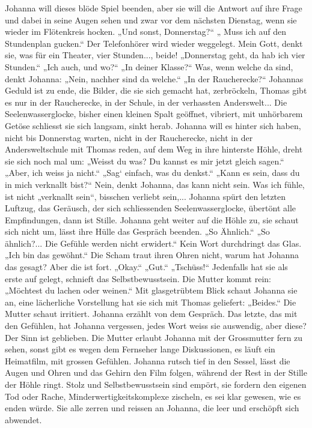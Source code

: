 Johanna will dieses blöde Spiel beenden, aber sie will die Antwort auf ihre Frage und dabei in seine Augen sehen und zwar vor dem nächsten Dienstag, wenn sie wieder im Flötenkreis hocken. „Und sonst, Donnerstag?“ „ Muss ich auf den Stundenplan gucken.“ Der Telefonhörer wird wieder weggelegt. Mein Gott, denkt sie, was für ein Theater, vier Stunden..., beide! „Donnerstag geht, da hab ich vier Stunden.“ „Ich auch, und wo?“ „In deiner Klasse?“ Was, wenn welche da sind, denkt Johanna: „Nein, nachher sind da welche.“ „In der Raucherecke?“ Johannas Geduld ist zu ende, die Bilder, die sie sich gemacht hat, zerbröckeln, Thomas gibt es nur in der Raucherecke, in der Schule, in der verhassten Anderswelt... Die Seelenwasserglocke, bisher einen kleinen Spalt geöffnet, vibriert, mit unhörbarem Getöse schliesst sie sich langsam, sinkt herab. Johanna will es hinter sich haben, nicht bis Donnerstag warten, nicht in der Raucherecke, nicht in der Andersweltschule mit Thomas reden, auf dem Weg in ihre hinterste Höhle, dreht sie sich noch mal um: „Weisst du was? Du kannst es mir jetzt gleich sagen.“ „Aber, ich weiss ja nicht.“ „Sag` einfach, was du denkst.“ „Kann es sein, dass du in mich verknallt bist?“ Nein, denkt Johanna, das kann nicht sein. Was ich fühle, ist nicht „verknallt sein“, bisschen verliebt sein,...
Johanna spürt den letzten Luftzug, das Geräusch, der sich schliessenden Seelenwasserglocke, übertönt alle Empfindungen, dann ist Stille. Johanna geht weiter auf die Höhle zu, sie schaut sich nicht um, lässt ihre Hülle das Gespräch beenden.
„So Ähnlich.“ „So ähnlich?... Die Gefühle werden nicht erwidert.“ 
Kein Wort durchdringt das Glas. „Ich bin das gewöhnt.“ Die Scham traut ihren Ohren nicht, warum hat Johanna das gesagt? Aber die ist fort. „Okay.“ „Gut.“ „Tschüss!“ Jedenfalls hat sie als erste auf gelegt, schnieft das Selbstbewusstsein.
Die Mutter kommt rein: „Möchtest du lachen oder weinen.“ Mit glasgetrübtem Blick schaut  Johanna sie an, eine lächerliche Vorstellung hat sie sich mit Thomas geliefert: „Beides.“ Die Mutter schaut irritiert. Johanna erzählt von dem Gespräch. Das letzte, das mit den Gefühlen, hat Johanna vergessen, jedes Wort weiss sie auswendig, aber diese? Der Sinn ist geblieben.
Die Mutter erlaubt Johanna mit der Grossmutter fern zu sehen, sonst gibt es wegen dem Fernseher lange Diskussionen, es läuft ein Heimatfilm, mit grossen Gefühlen. Johanna rutsch tief in den Sessel, lässt die Augen und Ohren und das Gehirn den Film folgen, während der Rest in der Stille  der Höhle ringt. Stolz und Selbstbewusstsein sind empört, sie fordern den eigenen Tod oder Rache, Minderwertigkeitskomplexe zischeln, es sei klar gewesen, wie es enden würde. Sie alle zerren und reissen an Johanna, die leer und erschöpft sich abwendet.
